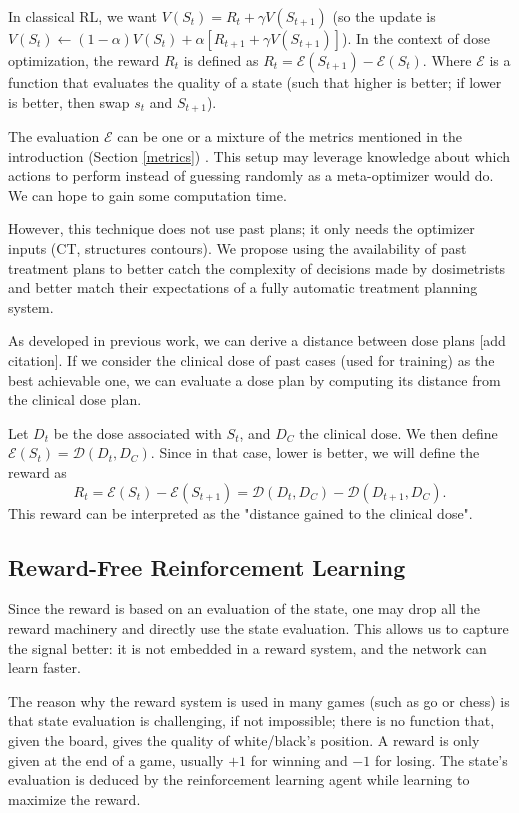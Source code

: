 In classical RL, we want $V(S_t) = R_t + \gamma V(S_{t+1})$
(so the update is $V(S_t) \leftarrow (1-\alpha) V(S_t) + \alpha \left[ R_{t+1} + \gamma V(S_{t+1}) \right]$).
In the context of dose optimization, the reward $R_t$ is defined as $R_t = \mathcal{E}(S_{t+1}) - \mathcal{E}(S_t)$.
Where $\mathcal{E}$ is a function that evaluates the quality of a state (such that higher is better; if lower is better, then swap $s_t$ and $S_{t+1}$).

The evaluation $\mathcal{E}$ can be one or a mixture of the metrics mentioned in the introduction (Section \ref{metrics}) \cite{shen_hierarchical_2021} \cite{shen_intelligent_2019} \cite{moreau_reinforcement_2021}.
This setup may leverage knowledge about which actions to perform instead of guessing randomly as a meta-optimizer would do.
We can hope to gain some computation time.

However, this technique does not use past plans; it only needs the optimizer inputs (CT, structures contours).
We propose using the availability of past treatment plans to better catch the complexity of decisions made by dosimetrists and better match their expectations of a fully automatic treatment planning system.

As developed in previous work, we can derive a distance between dose plans [add citation].
If we consider the clinical dose of past cases (used for training) as the best achievable one, we can evaluate a dose plan by computing its distance from the clinical dose plan.

Let $D_t$ be the dose associated with $S_t$, and $D_C$ the clinical dose.
We then define $\mathcal{E}(S_t) = \mathcal{D}(D_t, D_C)$.
Since in that case, lower is better, we will define the reward as $$R_t = \mathcal{E}(S_t) - \mathcal{E}(S_{t+1}) = \mathcal{D}(D_t, D_C) - \mathcal{D}(D_{t+1}, D_C).$$
This reward can be interpreted as the "distance gained to the clinical dose".


\subsection{Reward-Free Reinforcement Learning}

Since the reward is based on an evaluation of the state, one may drop all the reward machinery and directly use the state evaluation.
This allows us to capture the signal better: it is not embedded in a reward system, and the network can learn faster.

The reason why the reward system is used in many games (such as go or chess) is that state evaluation is challenging, if not impossible; there is no function that, given the board, gives the quality of white/black's position.
A reward is only given at the end of a game, usually $+1$ for winning and $-1$ for losing.
The state's evaluation is deduced by the reinforcement learning agent while learning to maximize the reward.

